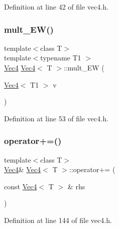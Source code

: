 Definition at line 42 of file vec4.\+h.

\mbox{\label{class_vec4_a50a2bc68e9d9093a5151577d4cacc4e8}} 
\subsubsection{\texorpdfstring{mult\_EW()}{mult\_EW()}\hspace{0.1cm}{\footnotesize\ttfamily [2/2]}}
{\footnotesize\ttfamily template$<$class T$>$ \\
template$<$typename T1 $>$ \\
\mbox{\hyperlink{class_vec4}{Vec4}} \mbox{\hyperlink{class_vec4}{Vec4}}$<$ T $>$\+::mult\+\_\+\+EW (\begin{DoxyParamCaption}\item[{\mbox{\hyperlink{class_vec4}{Vec4}}$<$ T1 $>$}]{v }\end{DoxyParamCaption})\hspace{0.3cm}{\ttfamily [inline]}}



Definition at line 53 of file vec4.\+h.

\mbox{\label{class_vec4_abd1f711e35e511b6a08d1596d407e5f9}} 
\subsubsection{\texorpdfstring{operator+=()}{operator+=()}}
{\footnotesize\ttfamily template$<$class T$>$ \\
\mbox{\hyperlink{class_vec4}{Vec4}}\& \mbox{\hyperlink{class_vec4}{Vec4}}$<$ T $>$\+::operator+= (\begin{DoxyParamCaption}\item[{const \mbox{\hyperlink{class_vec4}{Vec4}}$<$ T $>$ \&}]{rhs }\end{DoxyParamCaption})\hspace{0.3cm}{\ttfamily [inline]}}



Definition at line 144 of file vec4.\+h.

\mbox{\label{class_vec4_a548b78d8379bf1a0b01b7e24b2a62bc1}} 
